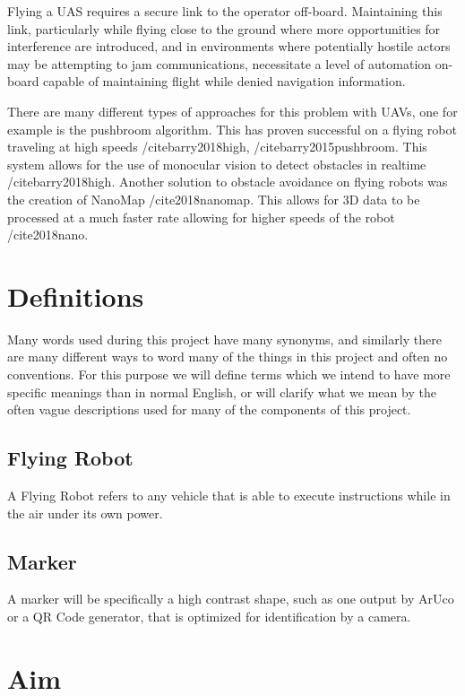 \documentclass[]{report}
\begin{document}
Flying a UAS requires a secure link to the operator off-board. Maintaining this link, particularly while flying close to the ground where more opportunities for interference are introduced, and in environments where potentially hostile actors may be attempting to jam communications, necessitate a level of automation on-board capable of maintaining flight while denied navigation information.

There are many different types of approaches for this problem with UAVs, one for example is the pushbroom algorithm. This has proven successful on a flying robot traveling at high speeds /cite{barry2018high}, /cite{barry2015pushbroom}. This system allows for the use of monocular vision to detect obstacles in realtime /cite{barry2018high}. Another solution to obstacle avoidance on flying robots was the creation of NanoMap /cite{2018nanomap}. This allows for 3D data to be processed at a much faster rate allowing for higher speeds of the robot /cite{2018nano}.
\section{Definitions}

Many words used during this project have many synonyms, and similarly there are many different ways to word many of the things in this project and often no conventions. For this purpose we will define terms which we intend to have more specific meanings than in normal English, or will clarify what we mean by the often vague descriptions used for many of the components of this project.

\subsection{Flying Robot}

A Flying Robot refers to any vehicle that is able to execute instructions while in the air under its own power.

\subsection{Marker}

A marker will be specifically a high contrast shape, such as one output by ArUco or a QR Code generator, that is optimized for identification by a camera.

\section{Aim}
\end{document}
